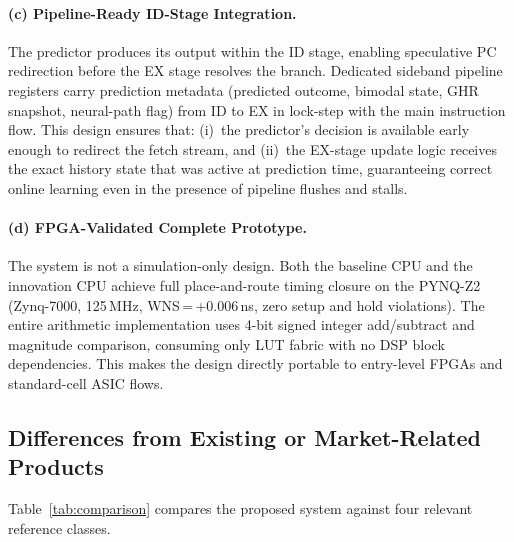 \documentclass[12pt,a4paper]{article}
\begin{document}
\paragraph{(c) Pipeline-Ready ID-Stage Integration.}
The predictor produces its output within the ID stage, enabling speculative
PC redirection before the EX stage resolves the branch. Dedicated sideband
pipeline registers carry prediction metadata (predicted outcome, bimodal state,
GHR snapshot, neural-path flag) from ID to EX in lock-step with the main
instruction flow. This design ensures that: (i)~the predictor's decision is
available early enough to redirect the fetch stream, and (ii)~the EX-stage
update logic receives the exact history state that was active at prediction
time, guaranteeing correct online learning even in the presence of pipeline
flushes and stalls.

\paragraph{(d) FPGA-Validated Complete Prototype.}
The system is not a simulation-only design. Both the baseline CPU and the
innovation CPU achieve full place-and-route timing closure on the PYNQ-Z2
(Zynq-7000, 125\,MHz, WNS\,=\,+0.006\,ns, zero setup and hold violations).
The entire arithmetic implementation uses 4-bit signed integer add/subtract
and magnitude comparison, consuming only LUT fabric with no DSP block
dependencies. This makes the design directly portable to entry-level FPGAs
and standard-cell ASIC flows.

\subsection{Differences from Existing or Market-Related Products}
\label{sec:comparison}

Table~\ref{tab:comparison} compares the proposed system against four relevant
reference classes.
\end{document}
